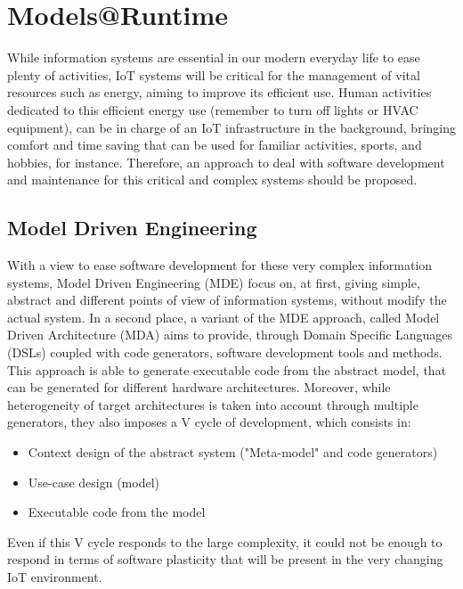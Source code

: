 \chapter{Models@Runtime}
\label{sec:MAR}
While information systems are essential in our modern everyday life to ease plenty of activities, IoT systems will be critical for the management of vital resources such as energy, aiming to improve its efficient use.
Human activities dedicated to this efficient energy use (remember to turn off lights or HVAC equipment), can be in charge of an IoT infrastructure in the background, bringing comfort and time saving that can be used for familiar activities, sports, and hobbies, for instance.
Therefore, an approach to deal with software development and maintenance for this critical and complex systems should be proposed.

\section{Model Driven Engineering}
With a view to ease software development for these very complex information systems, Model Driven Engineering (MDE) focus on, at first, giving simple, abstract and different points of view of information systems, without modify the actual system. 
In a second place, a variant of the MDE approach, called Model Driven Architecture (MDA)\cite{kleppe2003mda} aims to provide, through Domain Specific Languages (DSLs) coupled with code generators, software development tools and methods.
This approach is able to generate executable code from the abstract model, that can be generated for different hardware architectures.
Moreover, while heterogeneity of target architectures is taken into account through multiple generators, they also imposes a V cycle of development\cite{fouquet2013kevoree}, which consists in:
\begin{itemize}
	\item Context design of the abstract system ("Meta-model" and code generators)
	\item Use-case design (model)
	\item Executable code from the model
\end{itemize}
Even if this V cycle responds to the large complexity, it could not be enough to respond in terms of software plasticity that will be present in the very changing IoT environment.

